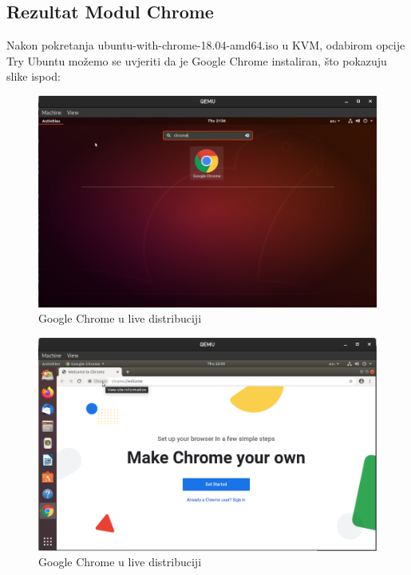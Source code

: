 \documentclass[12pt,vi]{mitthesis}
\begin{document}
\subsection*{Rezultat Modul Chrome}
\indent
Nakon pokretanja ubuntu-with-chrome-18.04-amd64.iso u KVM, odabirom opcije Try Ubuntu možemo se uvjeriti da je Google Chrome instaliran, što pokazuju slike ispod:
\begin{figure}[!htb]
\centering
\includegraphics[width=\linewidth]{images/chromeLive.png}
\caption{Google Chrome u live distribuciji}
\end{figure}
\begin{figure}[!htb]
\centering
\includegraphics[width=\linewidth]{images/chromeLive2.png}
\caption{Google Chrome u live distribuciji}
\end{figure}
\end{document}
